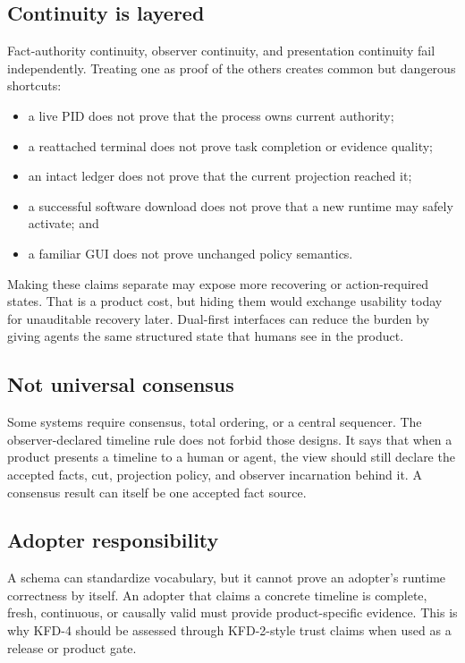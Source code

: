 \subsection{Continuity is layered}

Fact-authority continuity, observer continuity, and presentation continuity
fail independently. Treating one as proof of the others creates common but
dangerous shortcuts:

\begin{itemize}[leftmargin=*]
  \item a live PID does not prove that the process owns current authority;
  \item a reattached terminal does not prove task completion or evidence quality;
  \item an intact ledger does not prove that the current projection reached it;
  \item a successful software download does not prove that a new runtime may
        safely activate; and
  \item a familiar GUI does not prove unchanged policy semantics.
\end{itemize}

Making these claims separate may expose more recovering or action-required
states. That is a product cost, but hiding them would exchange usability today
for unauditable recovery later. Dual-first interfaces can reduce the burden by
giving agents the same structured state that humans see in the product.

\subsection{Not universal consensus}

Some systems require consensus, total ordering, or a central sequencer. The
observer-declared timeline rule does not forbid those designs. It says that when
a product presents a timeline to a human or agent, the view should still declare
the accepted facts, cut, projection policy, and observer incarnation behind it.
A consensus result can itself be one accepted fact source.

\subsection{Adopter responsibility}

A schema can standardize vocabulary, but it cannot prove an adopter's runtime
correctness by itself. An adopter that claims a concrete timeline is complete,
fresh, continuous, or causally valid must provide product-specific evidence.
This is why KFD-4 should be assessed through KFD-2-style trust claims when used
as a release or product gate.


